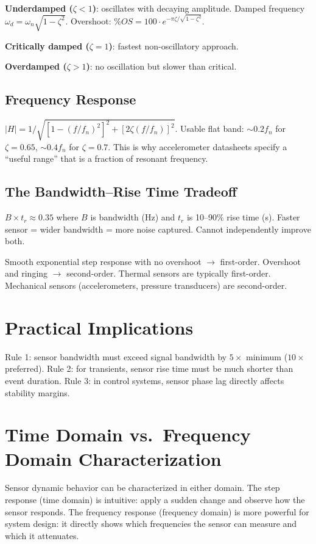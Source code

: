 \documentclass[11pt,letterpaper,twoside,openany]{book}
\begin{document}
\textbf{Underdamped ($\zeta < 1$)}: oscillates with decaying amplitude. Damped frequency $\omega_d = \omega_n\sqrt{1-\zeta^2}$. Overshoot: $\%OS = 100 \cdot e^{-\pi\zeta/\sqrt{1-\zeta^2}}$.

\textbf{Critically damped ($\zeta = 1$)}: fastest non-oscillatory approach.

\textbf{Overdamped ($\zeta > 1$)}: no oscillation but slower than critical.

\subsection{Frequency Response}
$|H| = 1/\sqrt{[1-(f/f_n)^2]^2 + [2\zeta(f/f_n)]^2}$. Usable flat band: $\sim 0.2 f_n$ for $\zeta = 0.65$, $\sim 0.4 f_n$ for $\zeta = 0.7$. This is why accelerometer datasheets specify a ``useful range'' that is a fraction of resonant frequency.

\subsection{The Bandwidth--Rise Time Tradeoff}
$B \times t_r \approx 0.35$ where $B$ is bandwidth (Hz) and $t_r$ is 10--90\% rise time (s). Faster sensor = wider bandwidth = more noise captured. Cannot independently improve both.

\begin{tipbox}
Smooth exponential step response with no overshoot $\to$ first-order. Overshoot and ringing $\to$ second-order. Thermal sensors are typically first-order. Mechanical sensors (accelerometers, pressure transducers) are second-order.
\end{tipbox}

\section{Practical Implications}
Rule 1: sensor bandwidth must exceed signal bandwidth by $5\times$ minimum ($10\times$ preferred). Rule 2: for transients, sensor rise time must be much shorter than event duration. Rule 3: in control systems, sensor phase lag directly affects stability margins.


\section{Time Domain vs.\ Frequency Domain Characterization}
Sensor dynamic behavior can be characterized in either domain. The step response (time domain) is intuitive: apply a sudden change and observe how the sensor responds. The frequency response (frequency domain) is more powerful for system design: it directly shows which frequencies the sensor can measure and which it attenuates.
\end{document}
